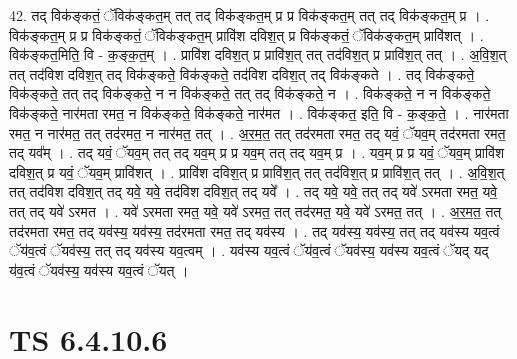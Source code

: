 \documentclass[17pt]{extarticle}
\begin{document}
42. तद् विक॑ङ्कतं॒ ॅविक॑ङ्कत॒म् तत् तद् विक॑ङ्कत॒म् प्र प्र विक॑ङ्कत॒म् तत् तद् विक॑ङ्कत॒म् प्र । . विक॑ङ्कत॒म् प्र प्र विक॑ङ्कतं॒ ॅविक॑ङ्कत॒म् प्रावि॑श दविश॒त् प्र विक॑ङ्कतं॒ ॅविक॑ङ्कत॒म् प्रावि॑शत् । . विक॑ङ्कत॒मिति॒ वि - क॒ङ्क॒त॒म् । . प्रावि॑श दविश॒त् प्र प्रावि॑श॒त् तत् तद॑विश॒त् प्र प्रावि॑श॒त् तत् । . अ॒वि॒श॒त् तत् तद॑विश दविश॒त् तद् विक॑ङ्कते॒ विक॑ङ्कते॒ तद॑विश दविश॒त् तद् विक॑ङ्कते । . तद् विक॑ङ्कते॒ विक॑ङ्कते॒ तत् तद् विक॑ङ्कते॒ न न विक॑ङ्कते॒ तत् तद् विक॑ङ्कते॒ न । . विक॑ङ्कते॒ न न विक॑ङ्कते॒ विक॑ङ्कते॒ नार॑मता रमत॒ न विक॑ङ्कते॒ विक॑ङ्कते॒ नार॑मत । . विक॑ङ्कत॒ इति॒ वि - क॒ङ्क॒ते॒ । . नार॑मता रमत॒ न नार॑मत॒ तत् तद॑रमत॒ न नार॑मत॒ तत् । . अ॒र॒म॒त॒ तत् तद॑रमता रमत॒ तद् यवं॒ ॅयव॒म् तद॑रमता रमत॒ तद् यव᳚म् । . तद् यवं॒ ॅयव॒म् तत् तद् यव॒म् प्र प्र यव॒म् तत् तद् यव॒म् प्र । . यव॒म् प्र प्र यवं॒ ॅयव॒म् प्रावि॑श दविश॒त् प्र यवं॒ ॅयव॒म् प्रावि॑शत् । . प्रावि॑श दविश॒त् प्र प्रावि॑श॒त् तत् तद॑विश॒त् प्र प्रावि॑श॒त् तत् । . अ॒वि॒श॒त् तत् तद॑विश दविश॒त् तद् यवे॒ यवे॒ तद॑विश दविश॒त् तद् यवे᳚ । . तद् यवे॒ यवे॒ तत् तद् यवे॑ ऽरमता रमत॒ यवे॒ तत् तद् यवे॑ ऽरमत । . यवे॑ ऽरमता रमत॒ यवे॒ यवे॑ ऽरमत॒ तत् तद॑रमत॒ यवे॒ यवे॑ ऽरमत॒ तत् । . अ॒र॒म॒त॒ तत् तद॑रमता रमत॒ तद् यव॑स्य॒ यव॑स्य॒ तद॑रमता रमत॒ तद् यव॑स्य । . तद् यव॑स्य॒ यव॑स्य॒ तत् तद् यव॑स्य यव॒त्वं ॅय॑व॒त्वं ॅयव॑स्य॒ तत् तद् यव॑स्य यव॒त्वम् । . यव॑स्य यव॒त्वं ॅय॑व॒त्वं ॅयव॑स्य॒ यव॑स्य यव॒त्वं ॅयद् यद् य॑व॒त्वं ॅयव॑स्य॒ यव॑स्य यव॒त्वं ॅयत् । \newline
\pagebreak
{}

\section{ TS 6.4.10.6 }
\end{document}
